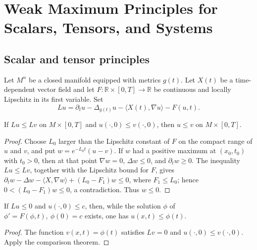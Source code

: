 \chapter[10]{Weak Maximum Principles for Scalars, Tensors, and Systems}
\label{chow-ii-ch10-weak-maximum-principles}

\section{Scalar and tensor principles}

\begin{definition}
\label{def:chow-ii-semilinear-heat-operator}
Let $M^n$ be a closed manifold equipped with metrics $g(t)$.  Let $X(t)$ be a
time-dependent vector field and let $F:\mathbb R\times[0,T]\to\mathbb R$ be
continuous and locally Lipschitz in its first variable.  Set
\[
 Lu=\partial_tu-\Delta_{g(t)}u-\langle X(t),\nabla u\rangle-F(u,t).
\]
\end{definition}

\begin{theorem}
\label{thm:chow-ii-scalar-comparison}
If $Lu\le Lv$ on $M\times[0,T]$ and $u(\cdot,0)\le v(\cdot,0)$, then
\(u\le v\) on $M\times[0,T]$.
\end{theorem}
\begin{proof}
\sketch
{}
Choose $L_0$ larger than the Lipschitz constant of $F$ on the compact range of
$u$ and $v$, and put $w=e^{-L_0t}(u-v)$.  If $w$ had a positive maximum at
$(x_0,t_0)$ with $t_0>0$, then at that point
\(\nabla w=0\), $\Delta w\le0$, and $\partial_tw\ge0$.  The inequality
\(Lu\le Lv\), together with the Lipschitz bound for $F$, gives
\(\partial_tw-\Delta w-\langle X,\nabla w\rangle+(L_0-F_1)w\le0\), where
$F_1\le L_0$; hence $0< (L_0-F_1)w\le0$, a contradiction.  Thus $w\le0$.
\end{proof}

\begin{theorem}
\label{thm:chow-ii-scalar-wmp}
If $Lu\le0$ and $u(\cdot,0)\le c$, then, while the solution $\phi$ of
\(\phi'=F(\phi,t),\ \phi(0)=c\) exists, one has $u(x,t)\le\phi(t)$.
\end{theorem}
\begin{proof}
\sketch
{}
The function $v(x,t)=\phi(t)$ satisfies $Lv=0$ and $u(\cdot,0)\le v(\cdot,0)$.
Apply the comparison theorem.
\end{proof}


